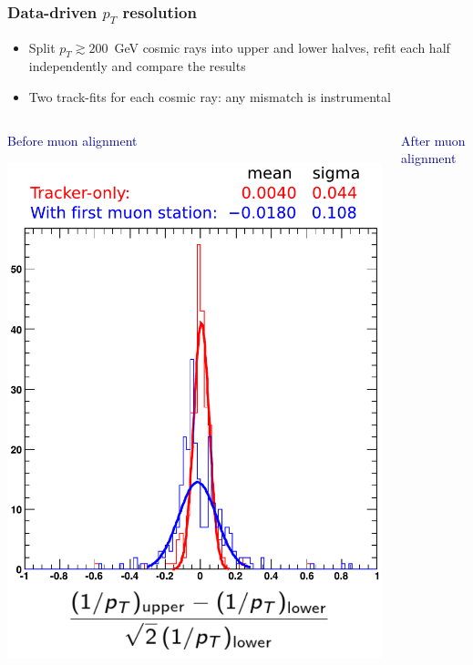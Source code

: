 \documentclass[compress]{beamer}
\begin{document}
\begin{frame}
\frametitle{Data-driven $p_T$ resolution}

\begin{itemize}
\item Split $p_T \gtrsim 200$~GeV cosmic rays into upper and lower halves, refit each half independently and compare the results
\item Two track-fits for each cosmic ray: any mismatch is instrumental
\end{itemize}

\vspace{-0.5 cm}
\begin{columns}
\begin{center}
\textcolor{darkblue}{Before muon alignment}

\includegraphics[width=0.9\linewidth]{without_alignment.pdf}
\end{center}
\begin{center}
\textcolor{darkblue}{After muon alignment}


\end{center}
\end{columns}
\end{frame}
\end{document}
